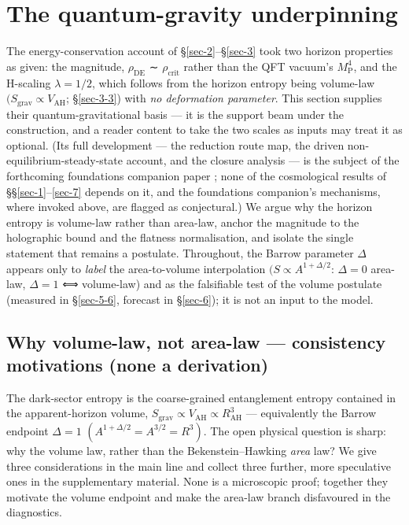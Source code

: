 \documentclass[preprint,12pt]{elsarticle}
\begin{document}
\section{The quantum-gravity underpinning}\label{sec-8}

The energy-conservation account of §\ref{sec-2}--§\ref{sec-3} took two
horizon properties as given: the magnitude, \(\rho _\mathrm{DE}\) ∼
\(\rho _{\mathrm{crit}}\) rather than the QFT vacuum's
\(M_{\mathrm{P}}^{4}\), and the H-scaling \(\lambda  = 1/2\), which
follows from the horizon entropy being volume-law
\((S_{\mathrm{grav}} \propto  V_\mathrm{AH}\); §\ref{sec-3-3}) with
\emph{no deformation parameter}. This section supplies their
quantum-gravitational basis --- it is the support beam under the
construction, and a reader content to take the two scales as inputs may
treat it as optional. (Its full development --- the reduction route map,
the driven non-equilibrium-steady-state account, and the closure
analysis --- is the subject of the forthcoming foundations companion
paper \citep{Pandev:2026foundations}; none of the cosmological results
of §§\ref{sec-1}--\ref{sec-7} depends on it, and the foundations
companion's mechanisms, where invoked above, are flagged as
conjectural.) We argue why the horizon entropy is volume-law rather than
area-law, anchor the magnitude to the holographic bound and the flatness
normalisation, and isolate the single statement that remains a
postulate. Throughout, the Barrow parameter \(\Delta\) appears only to
\emph{label} the area-to-volume interpolation
\((S \propto  A^{1+\Delta /2}\): \(\Delta =0\) area-law, \(\Delta =1\) ⟺
volume-law) and as the falsifiable test of the volume postulate
(measured in §\ref{sec-5-6}, forecast in §\ref{sec-6}); it is not an
input to the model.

\subsection{Why volume-law, not area-law --- consistency motivations
(none a derivation)}\label{sec-8-1}

The dark-sector entropy is the coarse-grained entanglement entropy
contained in the apparent-horizon volume,
\(S_{\mathrm{grav}} \propto  V_\mathrm{AH} \propto  R_\mathrm{AH}^{3}\)
--- equivalently the Barrow endpoint \(\Delta =1\)
\((A^{1+\Delta /2} = A^{3/2} = R^{3})\). The open physical question is
sharp: why the volume law, rather than the Bekenstein--Hawking
\emph{area} law? We give three considerations in the main line and
collect three further, more speculative ones in the supplementary
material. None is a microscopic proof; together they motivate the volume
endpoint and make the area-law branch disfavoured in the diagnostics.
\end{document}

